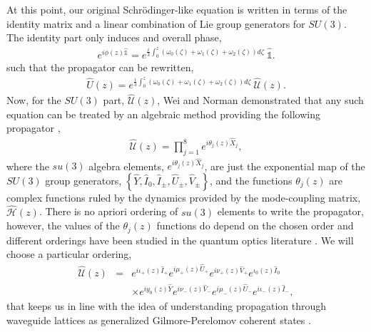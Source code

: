 \documentclass[9pt,twocolumn,twoside]{osajnl}
\begin{document}
At this point, our original Schr\"odinger-like equation is written in terms of the identity matrix and a linear combination of Lie group generators for $SU(3)$.
The identity part only induces and overall phase,
\begin{eqnarray}
e^{i \phi(z) \hat{\mathbb{1}}} = e^{\frac{i}{3} \int_{0}^{z} \left(\omega_{0}(\zeta) + \omega_{1}(\zeta) + \omega_{2}(\zeta) \right) d\zeta } ~\hat{\mathbb{1}} .
\end{eqnarray}
such that the propagator can be rewritten,
\begin{eqnarray}
	\hat{U}(z) =  e^{ \frac{i}{3} \int_{0}^{z} ( \omega_{0}(\zeta) + \omega_{1}(\zeta) + \omega_{2}(\zeta) ) d\zeta} ~\hat{\mathcal{U}}(z).
\end{eqnarray}
Now, for the $SU(3)$ part, $\hat{\mathcal{U}}(z)$, Wei and Norman demonstrated that any such equation can be treated by an algebraic method providing the following propagator \cite{Wei1963p575},
\begin{eqnarray}
	\hat{\mathcal{U}}(z) = \prod_{j=1}^{8} e^{i \theta_{j}(z) \hat{X}_{j}},
\end{eqnarray}
where the $su(3)$ algebra elements, $e^{i \theta_{j}(z) \hat{X}_{j}}$, are just the exponential map of the $SU(3)$ group generators, $\left\{ \hat{Y}, \hat{I}_{0}, \hat{I}_{\pm}, \hat{U}_{\pm}, \hat{V}_{\pm} \right\}$, and the functions $\theta_{j}(z)$ are complex functions ruled by the dynamics provided by the mode-coupling matrix, $\hat{\mathcal{H}}(z)$.
There is no apriori ordering of $su(3)$ elements to write the propagator, however, the values of the $\theta_{j}(z)$ functions do depend on the chosen order and different orderings have been studied in the quantum optics literature \cite{Dattoli1987p1582,Dattoli1991p1247,Dattoli1990p236,Gnutzmann1998p9871}.
We will choose a particular ordering,
\begin{eqnarray}
\hat{\mathcal{U}}(z) &=& e^{i \iota_{+}(z) \hat{I}_{+}} e^{i \mu_{+}(z) \hat{U}_{+}}  
e^{i \nu_{+}(z) \hat{V}_{+}} e^{ \iota_{0}(z) \hat{I}_{0}} \nonumber \\ 
&& \times e^{i y_{0}(z) \hat{Y}}  e^{i \nu_{-}(z) \hat{V}_{-}} e^{i \mu_{-}(z) \hat{U}_{-}} e^{i \iota_{-}(z) \hat{I}_{-}}, \label{eq:prop}
\end{eqnarray}
that keeps us in line with the idea of understanding propagation through waveguide lattices as generalized Gilmore-Perelomov coherent states \cite{VillanuevaVergara2015p}.
\end{document}
